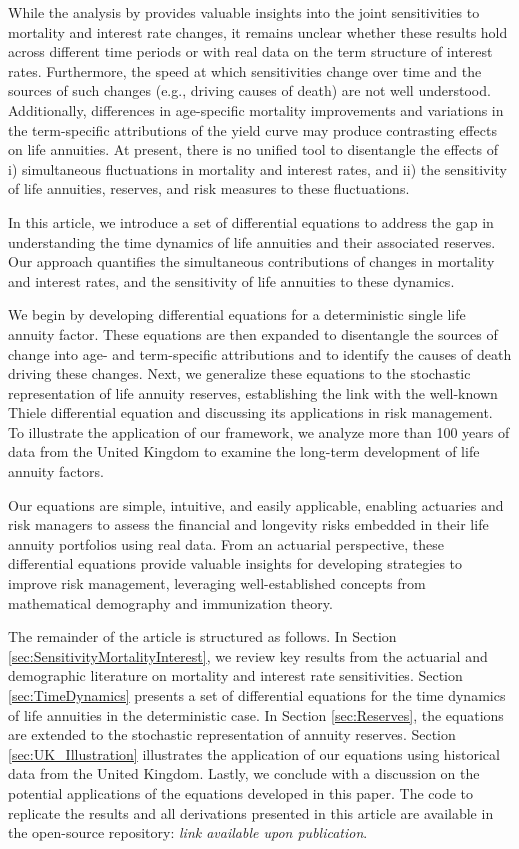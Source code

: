 \documentclass[12pt]{article}
\begin{document}
While the analysis by \citet{rabitti2020mortality} provides valuable insights into the joint sensitivities to mortality and interest rate changes, it remains unclear whether these results hold across different time periods or with real data on the term structure of interest rates. Furthermore, the speed at which sensitivities change over time and the sources of such changes (e.g., driving causes of death) are not well understood. Additionally, differences in age-specific mortality improvements and variations in the term-specific attributions of the yield curve may produce contrasting effects on life annuities. At present, there is no unified tool to disentangle the effects of i) simultaneous fluctuations in mortality and interest rates, and ii) the sensitivity of life annuities, reserves, and risk measures to these fluctuations.

In this article, we introduce a set of differential equations to address the gap in understanding the time dynamics of life annuities and their associated reserves. Our approach quantifies the simultaneous contributions of changes in mortality and interest rates, and the sensitivity of life annuities to these dynamics.

We begin by developing differential equations for a deterministic single life annuity factor. These equations are then expanded to disentangle the sources of change into age- and term-specific attributions and to identify the causes of death driving these changes. Next, we generalize these equations to the stochastic representation of life annuity reserves, establishing the link with the well-known Thiele differential equation and discussing its applications in risk management. To illustrate the application of our framework, we analyze more than 100 years of data from the United Kingdom to examine the long-term development of life annuity factors.

Our equations are simple, intuitive, and easily applicable, enabling actuaries and risk managers to assess the financial and longevity risks embedded in their life annuity portfolios using real data. From an actuarial perspective, these differential equations provide valuable insights for developing strategies to improve risk management, leveraging well-established concepts from mathematical demography and immunization theory.

The remainder of the article is structured as follows. In Section \ref{sec:SensitivityMortalityInterest}, we review key results from the actuarial and demographic literature on mortality and interest rate sensitivities. Section \ref{sec:TimeDynamics} presents a set of differential equations for the time dynamics of life annuities in the deterministic case. In Section \ref{sec:Reserves}, the equations are extended to the stochastic representation of annuity reserves. Section \ref{sec:UK_Illustration} illustrates the application of our equations using historical data from the United Kingdom. Lastly, we conclude with a discussion on the potential applications of the equations developed in this paper. The code to replicate the results and all derivations presented in this article are available in the open-source repository: \textit{link available upon publication}.
\end{document}
